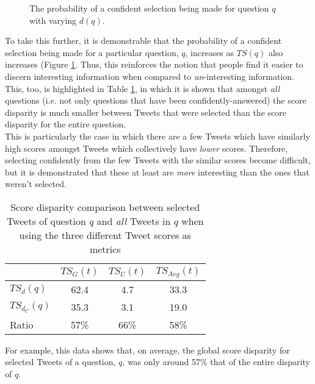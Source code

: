  \begin{figure}[h]
\caption{The probability of a confident selection being made for question $q$ with varying $d(q)$.}
\label{fig:cum-question-disparity}
\end{figure}

To take this further, it is demonstrable that the probability of a confident selection being made for a particular question, $q$, increases as $TS(q)$ also increases (Figure \ref{fig:cum-question-disparity}.  Thus, this reinforces the notion that people find it easier to discern interesting information when compared to \textit{un}-interesting information. This, too, is highlighted in Table \ref{table:score_disparities_2}, in which it is shown that amongst \textit{all} questions (i.e. not only questions that have been confidently-answered) the score disparity is much smaller between Tweets that were selected than the score disparity for the entire question. \\
This is particularly the case in which there are a few Tweets which have similarly high scores amongst Tweets which collectively have \textit{lower} scores. Therefore, selecting confidently from the few Tweets with the similar scores become difficult, but it is demonstrated that these at least are \textit{more} interesting than the ones that weren't selected.\\

\begin{table}[h]\footnotesize
\begin{center}
\begin{tabular}{ l || c | c | c }
	   & $TS_G(t)$ &  $TS_U(t)$ &  $TS_{Avg}(t)$\\
	 \hline
	$TS_d(q)$ & 62.4 & 4.7 & 33.3\\
	$TS_{d_C}(q)$ & 35.3 & 3.1 & 19.0\\
	\hline
	Ratio & 57\% & 66\% & 58\%
\end{tabular}
\end{center}
\caption{Score disparity comparison between selected Tweets of question $q$ and \textit{all} Tweets in $q$ when using the three different Tweet scores as metrics}
\label{table:score_disparities_2}
\end{table}

For example, this data shows that, on average, the global score disparity for selected Tweets of a question, $q$, was only around 57\% that of the entire disparity of $q$.
